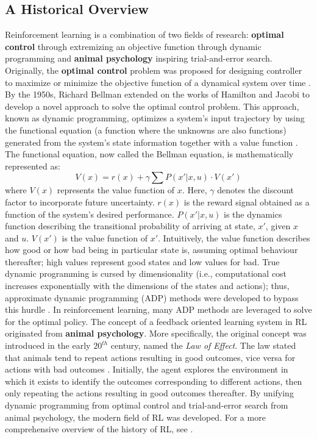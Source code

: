 \subsection{A Historical Overview}
Reinforcement learning is a combination of two fields of research: \textbf{optimal control} through extremizing an objective function through dynamic programming and \textbf{animal psychology} inspiring trial-and-error search. Originally, the \textbf{optimal control} problem was proposed for designing controller to maximize or minimize the objective function of a dynamical system over time \cite{mpc}.  By the 1950s, Richard Bellman extended on the works of Hamilton and Jacobi to develop a novel approach to solve the optimal control problem.  This approach, known as dynamic programming, optimizes a system's input trajectory by using the functional equation (a function where the unknowns are also functions) generated from the system's state information together with a value function \cite{bellman1}.  The functional equation, now called the Bellman equation, is mathematically represented as:
\begin{equation}
    V(x) = r(x) + \gamma \sum P(x' | x, u) \cdot V(x')
    \label{eq:bellman_eq}
\end{equation}
where $V(x)$ represents the value function of $x$. Here, $\gamma$ denotes the discount factor to incorporate future uncertainty. $r(x)$ is the reward signal obtained as a function of the system's desired performance. $P(x'|x, u)$ is the dynamics function describing the transitional probability of arriving at state, $x'$, given $x$ and $u$. $V(x')$ is the value function of $x'$. Intuitively, the value function describes how good or how bad being in particular state is, assuming optimal behaviour thereafter; high values represent good states and low values for bad.  True dynamic programming is cursed by dimensionality (i.e., computational cost increases exponentially with the dimensions of the states and actions); thus, approximate dynamic programming (ADP) methods were developed to bypass this hurdle \cite{adp}.  In reinforcement learning, many ADP methods are leveraged to solve for the optimal policy. The concept of a feedback oriented learning system in RL originated from \textbf{animal psychology}. More specifically, the original concept was introduced in the early $20^{th}$ century, named the \textit{Law of Effect}. The law stated that animals tend to repeat actions resulting in good outcomes, vice versa for actions with bad outcomes \cite{thorndike}. Initially, the agent explores the environment in which it exists to identify the outcomes corresponding to different actions, then only repeating the actions resulting in good outcomes thereafter. By unifying dynamic programming from optimal control and trial-and-error search from animal psychology, the modern field of RL was developed. For a more comprehensive overview of the history of RL, see \cite{sutton}.

